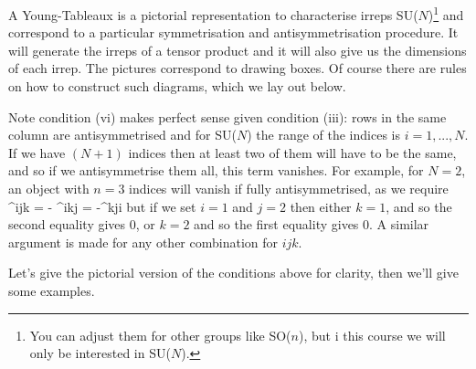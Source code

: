 A Young-Tableaux is a pictorial representation to characterise irreps SU($N$)\footnote{You can adjust them for other groups like SO($n$), but i this course we will only be interested in SU($N$).} and correspond to a particular symmetrisation and antisymmetrisation procedure. It will generate the irreps of a tensor product and it will also give us the dimensions of each irrep. The pictures correspond to drawing boxes. Of course there are rules on how to construct such diagrams, which we lay out below. 


\br 
\label{rem:NRowsYT}
    Note condition (vi) makes perfect sense given condition (iii): rows in the same column are antisymmetrised and for SU($N$) the range of the indices is $i=1,...,N$. If we have $(N+1)$ indices then at least two of them will have to be the same, and so if we antisymmetrise them all, this term vanishes. For example, for $N=2$, an object with $n=3$ indices will vanish if fully antisymmetrised, as we require 
    \bse 
        \phi^{ijk} = - \phi^{ikj} = -\phi^{kji}
    \ese 
    but if we set $i=1$ and $j=2$ then either $k=1$, and so the second equality gives 0, or $k=2$ and so the first equality gives 0. A similar argument is made for any other combination for $ijk$. 
\er 

Let's give the pictorial version of the conditions above for clarity, then we'll give some examples. 

